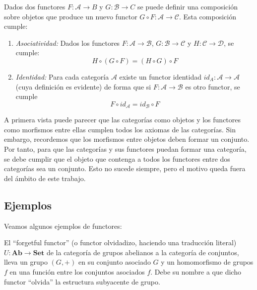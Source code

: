 \begin{observacion}
    Dados dos functores $F: \mathscr{A} \longrightarrow {B}$ y $G: \mathscr{B} \longrightarrow {C}$ se puede definir una composición sobre objetos que produce un nuevo functor $G \circ F: \mathscr{A} \longrightarrow \mathscr{C}$. Esta composición cumple:

    \begin{enumerate}
        \item \textit{Asociatividad: } Dados los functores $F: \mathscr{A} \longrightarrow \mathscr{B}$, $G: \mathscr{B} \longrightarrow \mathscr{C}$ y $H: \mathscr{C} \longrightarrow \mathscr{D}$, se cumple: \begin{equation}
            H \circ (G \circ F) = (H \circ G) \circ F   
        \end{equation}
        \item \textit{Identidad: } Para cada categoría $\mathscr{A}$ existe un functor identidad $id_A: \mathscr{A} \longrightarrow \mathscr{A}$ (cuya definición es evidente) de forma que si $F: \mathscr{A} \longrightarrow \mathscr{B}$ es otro functor, se cumple \begin{equation}
            F \circ id_{\mathscr{A}} = id_{\mathscr{B}} \circ F 
        \end{equation} 
    \end{enumerate}
\end{observacion}

A primera vista puede parecer que las categorías como objetos y los functores como morfismos entre ellas cumplen todos los axiomas de las categorías.  Sin embargo, recordemos que los morfismos entre objetos deben formar un conjunto. Por tanto, para que las categorías y sus functores puedan formar una categoría, se debe cumplir que el objeto que contenga a todos los functores entre dos categorías sea un conjunto. Esto no sucede siempre, pero el motivo queda fuera del ámbito de este trabajo.

\subsection{Ejemplos}
Veamos algunos ejemplos de functores:

\begin{ejemplo}
    El ``forgetful functor'' (o functor olvidadizo, haciendo una traducción literal) $U: \textbf{Ab} \longrightarrow \textbf{Set} $ de la categoría de grupos abelianos a la categoría de conjuntos, lleva un grupo $(G,+)$ en su conjunto asociado $G$ y un homomorfismo de grupos $f$ en una función entre los conjuntos asociados $f$. Debe su nombre a que dicho functor ``olvida'' la estructura subyacente de grupo.
    \label{ej:forgetful}
\end{ejemplo}

